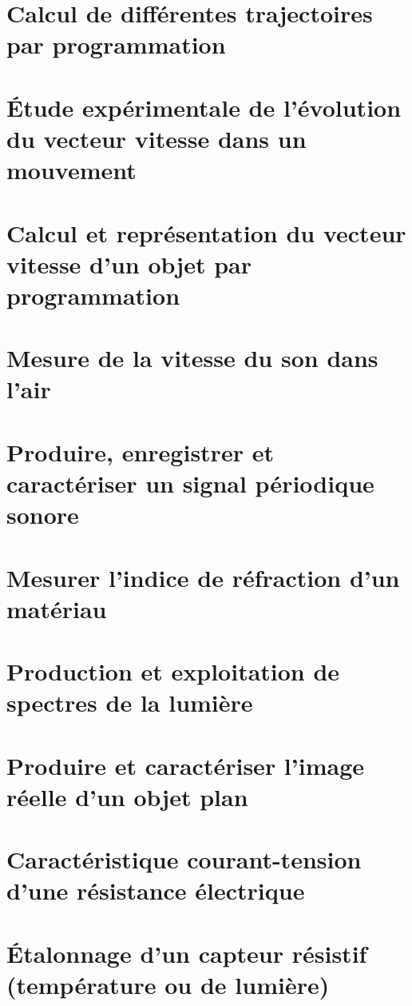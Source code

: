 \section{Calcul de différentes trajectoires par programmation}

\section{Étude expérimentale de l'évolution du vecteur vitesse dans un mouvement}

\section{Calcul et représentation du vecteur vitesse d'un objet par programmation}

\section{Mesure de la vitesse du son dans l'air}

\section{Produire, enregistrer et caractériser un signal périodique sonore}

\section{Mesurer l'indice de réfraction d'un matériau}

\section{Production et exploitation de spectres de la lumière}

\section{Produire et caractériser l'image réelle d'un objet plan}

\section{Caractéristique courant-tension d'une résistance électrique}

\section{Étalonnage d'un capteur résistif (température ou de lumière)}

